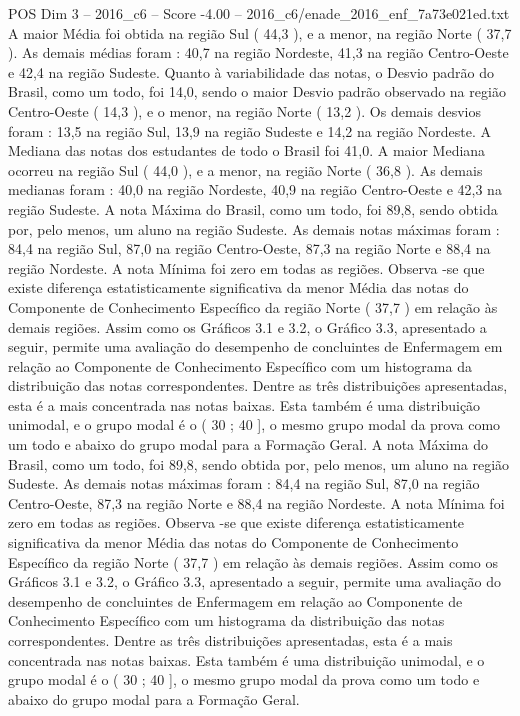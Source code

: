\begin{textsample}{POS Dim 3 – 2016\_c6 – Score -4.00 – 2016\_c6/enade\_2016\_enf\_7a73e021ed.txt}
A maior Média foi obtida na região Sul ( 44,3 ), e a menor, na região Norte ( 37,7 ).
As demais médias foram : 40,7 na região Nordeste, 41,3 na região Centro-Oeste e 42,4 na região Sudeste.
Quanto à variabilidade das notas, o Desvio padrão do Brasil, como um todo, foi 14,0, sendo o maior Desvio padrão observado na região Centro-Oeste ( 14,3 ), e o menor, na região Norte ( 13,2 ).
Os demais desvios foram : 13,5 na região Sul, 13,9 na região Sudeste e 14,2 na região Nordeste.
A Mediana das notas dos estudantes de todo o Brasil foi 41,0.
A maior Mediana ocorreu na região Sul ( 44,0 ), e a menor, na região Norte ( 36,8 ).
As demais medianas foram : 40,0 na região Nordeste, 40,9 na região Centro-Oeste e 42,3 na região Sudeste.
A nota Máxima do Brasil, como um todo, foi 89,8, sendo obtida por, pelo menos, um aluno na região Sudeste.
As demais notas máximas foram : 84,4 na região Sul, 87,0 na região Centro-Oeste, 87,3 na região Norte e 88,4 na região Nordeste.
A nota Mínima foi zero em todas as regiões.
Observa -se que existe diferença estatisticamente significativa da menor Média das notas do Componente de Conhecimento Específico da região Norte ( 37,7 ) em relação às demais regiões.
Assim como os Gráficos 3.1 e 3.2, o Gráfico 3.3, apresentado a seguir, permite uma avaliação do desempenho de concluintes de Enfermagem em relação ao Componente de Conhecimento Específico com um histograma da distribuição das notas correspondentes.
Dentre as três distribuições apresentadas, esta é a mais concentrada nas notas baixas.
Esta também é uma distribuição unimodal, e o grupo modal é o ( 30 ; 40 ], o mesmo grupo modal da prova como um todo e abaixo do grupo modal para a Formação Geral.
A nota Máxima do Brasil, como um todo, foi 89,8, sendo obtida por, pelo menos, um aluno na região Sudeste.
As demais notas máximas foram : 84,4 na região Sul, 87,0 na região Centro-Oeste, 87,3 na região Norte e 88,4 na região Nordeste.
A nota Mínima foi zero em todas as regiões.
Observa -se que existe diferença estatisticamente significativa da menor Média das notas do Componente de Conhecimento Específico da região Norte ( 37,7 ) em relação às demais regiões.
Assim como os Gráficos 3.1 e 3.2, o Gráfico 3.3, apresentado a seguir, permite uma avaliação do desempenho de concluintes de Enfermagem em relação ao Componente de Conhecimento Específico com um histograma da distribuição das notas correspondentes.
Dentre as três distribuições apresentadas, esta é a mais concentrada nas notas baixas.
Esta também é uma distribuição unimodal, e o grupo modal é o ( 30 ; 40 ], o mesmo grupo modal da prova como um todo e abaixo do grupo modal para a Formação Geral.

\end{textsample}
